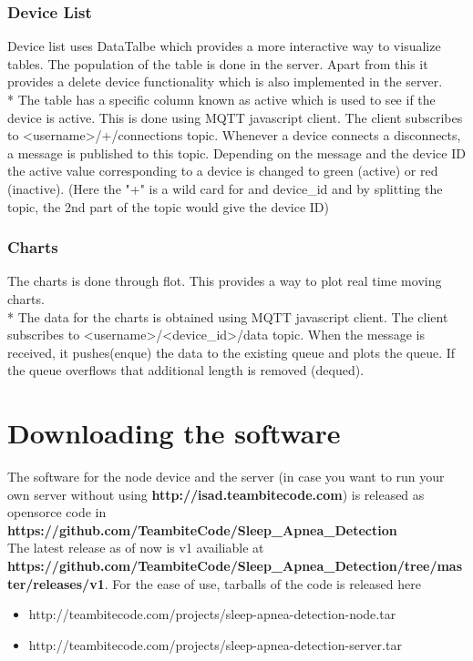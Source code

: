 \documentclass{report}
\begin{document}
\subsection{Device List}
Device list uses DataTalbe which provides a more interactive way to visualize tables. The population of the table is done in the server. Apart from this it provides a delete device functionality which is also implemented in the server.\\*
The table has a specific column known as active which is used to see if the device is active. This is done using MQTT javascript client. The client subscribes to <username>/+/connections topic. Whenever a device connects a disconnects, a message is published to this topic. Depending on the message and the device ID the active value corresponding to a device is changed to green (active) or red (inactive). (Here the "+" is a wild card for and device\_id and by splitting the topic, the 2nd part of the topic would give the device ID)

\subsection{Charts}
The charts is done through flot. This provides a way to plot real time moving charts.\\*
The data for the charts is obtained using MQTT javascript client. The client subscribes to <username>/<device\_id>/data topic. When the message is received, it pushes(enque) the data to the existing queue and plots the queue. If the queue overflows that additional length is removed (dequed).

\chapter{Downloading the software}

The software for the node device and the server (in case you want to run your own server without using \textbf{http://isad.teambitecode.com}) is released as opensorce code in \textbf{https://github.com/TeambiteCode/Sleep\_Apnea\_Detection}\\
The latest release as of now is v1 availiable at\\ \textbf{https://github.com/TeambiteCode/Sleep\_Apnea\_Detection/tree/master/releases/v1}. For the ease of use, tarballs of the code is released here\\
\begin{itemize}
    \item http://teambitecode.com/projects/sleep-apnea-detection-node.tar
    \item http://teambitecode.com/projects/sleep-apnea-detection-server.tar
\end{itemize}
\end{document}
